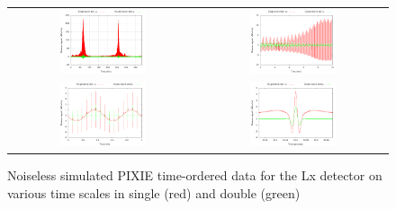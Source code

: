 \documentclass{article}
\begin{document}
\begin{figure}
	\centering
	\begin{tabular}{cc}
		\includegraphics[width=0.48\textwidth,trim=8mm 0 0mm 0mm]{plots/tod000_full.png} &
		\includegraphics[width=0.48\textwidth,trim=8mm 0 0mm 0mm]{plots/tod000_10min.png} \\
		\includegraphics[width=0.48\textwidth,trim=8mm 0 0mm 0mm]{plots/tod000_1min.png} &
		\includegraphics[width=0.48\textwidth,trim=8mm 0 0mm 0mm]{plots/tod000_stroke.png}
	\end{tabular}
	\caption{Noiseless simulated PIXIE time-ordered data for the Lx
	detector on various time scales in single (red) and double (green)
}
\end{figure}
\end{document}
